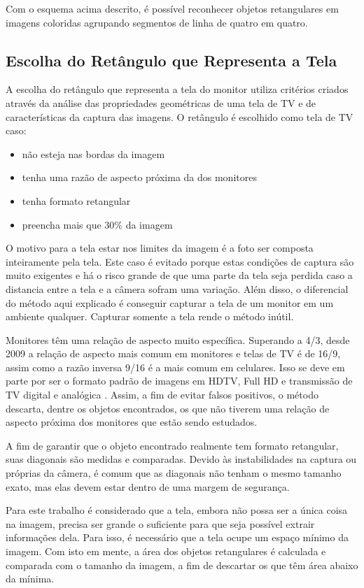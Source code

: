 Com o esquema acima descrito, é possível reconhecer objetos retangulares em imagens coloridas agrupando segmentos de linha de quatro em quatro.

\subsection {Escolha do Retângulo que Representa a Tela}

A escolha do retângulo que representa a tela do monitor utiliza critérios criados através da análise das propriedades geométricas de uma tela de TV e de características da captura das imagens. O retângulo é escolhido como tela de TV caso:

\begin{itemize}
\item não esteja nas bordas da imagem
\item  tenha uma razão de aspecto próxima da dos monitores
\item tenha formato retangular
\item preencha mais que 30\% da imagem
\end{itemize}

O motivo para a tela estar nos limites da imagem é a foto ser composta inteiramente pela tela. Este caso é evitado porque estas condições de captura são muito exigentes e há o risco grande de que uma parte da tela seja perdida caso a distancia entre a tela e a câmera sofram uma variação. Além disso, o diferencial do método aqui explicado é conseguir capturar a tela de um monitor em um ambiente qualquer. Capturar somente a tela rende o método inútil.

Monitores têm uma relação de aspecto muito específica. Superando a 4/3, desde 2009 a relação de aspecto mais comum em monitores e telas de TV é de 16/9, assim como a razão inversa 9/16 é a mais comum em celulares. Isso se deve em parte por ser o formato padrão de imagens em HDTV, Full HD e transmissão de TV digital e analógica \cite{DVB}. Assim, a fim de evitar falsos positivos, o método descarta, dentre os objetos encontrados, os que não tiverem uma relação de aspecto próxima dos monitores que estão sendo estudados.

A fim de garantir que o objeto encontrado realmente tem formato retangular, suas diagonais são medidas e comparadas. Devido às instabilidades na captura ou próprias da câmera, é comum que as diagonais não tenham o mesmo tamanho exato, mas elas devem estar dentro de uma margem de segurança.

Para este trabalho é considerado que a tela, embora não possa ser a única coisa na imagem, precisa ser grande o suficiente para que seja possível extrair informações dela. Para isso, é necessário que a tela ocupe um espaço mínimo da imagem. Com isto em mente, a área dos objetos retangulares é calculada e comparada com o tamanho da imagem, a fim de descartar os que têm área abaixo da mínima.

